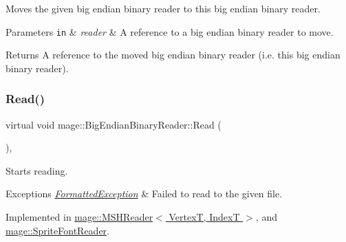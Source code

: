 Moves the given big endian binary reader to this big endian binary reader.


\begin{DoxyParams}[1]{Parameters}
\mbox{\tt in}  & {\em reader} & A reference to a big endian binary reader to move. \\
\hline
\end{DoxyParams}
\begin{DoxyReturn}{Returns}
A reference to the moved big endian binary reader (i.\+e. this big endian binary reader). 
\end{DoxyReturn}
\hypertarget{classmage_1_1_big_endian_binary_reader_af072965dea0319d6366b21cc6562bbf9}{}\label{classmage_1_1_big_endian_binary_reader_af072965dea0319d6366b21cc6562bbf9} 
\subsubsection{\texorpdfstring{Read()}{Read()}}
{\footnotesize\ttfamily virtual void mage\+::\+Big\+Endian\+Binary\+Reader\+::\+Read (\begin{DoxyParamCaption}{ }\end{DoxyParamCaption})\hspace{0.3cm}{\ttfamily [private]}, {}}

Starts reading.


\begin{DoxyExceptions}{Exceptions}
{\em \hyperlink{structmage_1_1_formatted_exception}{Formatted\+Exception}} & Failed to read to the given file. \\
\hline
\end{DoxyExceptions}


Implemented in \hyperlink{classmage_1_1_m_s_h_reader_a26b60060bf61183fb5758a4725c6a205}{mage\+::\+M\+S\+H\+Reader$<$ Vertex\+T, Index\+T $>$}, and \hyperlink{classmage_1_1_sprite_font_reader_af380ae127285a88ae41e35a9067db412}{mage\+::\+Sprite\+Font\+Reader}.

\hypertarget{classmage_1_1_big_endian_binary_reader_aec453e82d9b318e04894d4168db23715}{}\label{classmage_1_1_big_endian_binary_reader_aec453e82d9b318e04894d4168db23715} 
